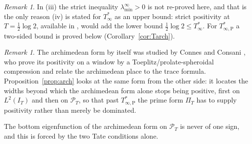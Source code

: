 \documentclass[11pt]{amsart}
\theoremstyle{definition}
\theoremstyle{remark}
\newtheorem{remark}[theorem]{Remark}
\newcommand{\PT}{\mathcal P_T}
\newcommand{\PiT}{\Pi_T}
\newcommand{\laminf}{\lambda^{\infty}_{\min}}
\begin{document}
\begin{remark}
In (iii) the strict inequality $\laminf>0$ is not re-proved here, and that is the only reason
(iv) is stated for $T^*_\infty$ as an upper bound: strict positivity at $T=\frac12\log2$,
available in \cite{Yoshida1992}, would add the lower bound $\frac12\log2\le T^*_\infty$. For
$T^*_{\infty,\mathrm P}$ a two-sided bound is proved below (Corollary~\ref{cor:Tarch}).
\end{remark}
\begin{remark}
The archimedean form by itself was studied by Connes and Consani \cite{ConnesConsani2021}, who prove
its positivity on a window by a Toeplitz/prolate-spheroidal compression and relate the archimedean
place to the trace formula. Proposition~\ref{prop:arch} looks at the same form from the other side:
it locates the widths beyond which the archimedean form alone stops being positive, first on
$L^2(I_T)$ and then on $\PT$, so that past $T^*_{\infty,\mathrm P}$ the prime form $\PiT$ has to
supply positivity rather than merely be dominated.
\end{remark}

The bottom eigenfunction of the archimedean form on $\PT$ is never of one sign, and this is forced
by the two Tate conditions alone.
\end{document}
